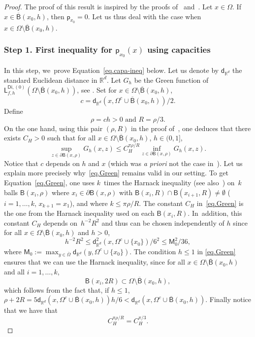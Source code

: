 \documentclass[JEP,XML,SOM,Unicode,NoEqCountersInSection,NoFloatCountersInSection,published]{cedram}
\let\pa\partial
\theoremstyle{plain}
\theoremstyle{definition}
\begin{document}
\begin{proof}
The proof of this result is inspired by the proofs of~\cite[Lem.\,4.6]{BEGK} and~\cite[Prop.\,7.9]{landim2017dirichlet}. Let $x\in \Omega$. If~$x\in \overline{\mathsf B}(x_0,h)$, then $\mathsf p_{x_0}=0$. Let us thus deal with the case when $x\in \Omega\setminus \overline{\mathsf B}(x_0,h)$.

\subsubsection*{Step 1. First inequality for $ \mathsf p_{x_0}(x)$ using capacities}

In this step, we~prove Equation~\eqref{eq.capa-ineq} below. Let us denote by $\mathsf d_{\mathbb R^d}$ the standard Euclidean distance in $\mathbb R^d$. Let $G_h$ be the Green function of $ \mathsf L^{\mathsf{Di},(0)}_{f,h}(\Omega\setminus \overline{\mathsf B}(x_0,h))$, see \cite[Eq.\,(2.3)]{BEGK}.
Set for $x\in \Omega\setminus \overline{\mathsf B}(x_0,h)$,
\begin{equation}\label{eq.cc}
c=\mathsf d_{\mathbb R^d}(x, \Omega^c\cup \overline{\mathsf B}(x_0,h))/2.
\end{equation}
Define
\[
\text{$\rho=ch>0$ and $R=\rho/3$}.
\]
On the one hand, using this pair $(\rho,R)$ in the proof of~\cite[Lem.\,4.6]{BEGK}, one deduces that there exists $C_H>0$ such that for all $x\in\Omega\setminus \overline{\mathsf B}(x_0,h) $, $h\in (0,1]$,
\begin{equation}\label{eq.Green}
\sup_{z\in \pa \mathsf B(x,\rho)}G_h(x,z) \le C_H^{\pi \rho/R}\inf_{z\in \pa \mathsf B(x,\rho)}G_h (x,z).
\end{equation}
Notice that $c$ depends on $h$ and $x$ (which was \textit{a priori} not the case in~\cite[Lem.\,4.6]{BEGK}). Let us explain more precisely why~\eqref{eq.Green} remains valid in our setting. To get Equation~\eqref{eq.Green}, one uses $k$~times the Harnack inequality \cite{MR1814364} (see also~\cite[Lem.\,4.1]{BEGK}) on~$k$ balls $\mathsf B(x_i,\rho)$ where $x_i\in \pa\mathsf B(x,\rho)$ with $\mathsf B(x_i,R)\cap \mathsf B(x_{i+1},R)\neq \emptyset$ ($i=1,\ldots,k$, $x_{k+1}=x_1$), and where $k\le \pi \rho/R$. The constant $C_H$ in~\eqref{eq.Green} is the one from the Harnack inequality used on each $\mathsf B(x_i,R)$. In~addition, this constant $C_H$ depends on~$h^{-2} R^2$ and thus can be chosen independently of $h$ since for all $x\in\Omega\setminus \overline{\mathsf B}(x_0,h)$ and $h>0$,
\[
h^{-2} R^2 \le \mathsf d_{\mathbb R^d}^2(x, \Omega^c\cup \{x_0\})/6^2 \le \mathsf M_0^2/36,
\]
where $\mathsf M_0:=\max_{y\in \overline{\Omega} }\mathsf d_{\mathbb R^d}(y, \Omega^c\cup \{x_0\})$.
The condition $h\le 1$ in \eqref{eq.Green} ensures that we can use the Harnack inequality, since for all $x\in \Omega\setminus \overline{\mathsf B}(x_0,h)$ and all $i=1,\ldots,k$,
\[
{\mathsf B(x_i,2R)} \subset \Omega\setminus \overline{\mathsf B}(x_0,h),
\]
which follows from the fact that, if $h\le 1$, $\rho +2R=5\mathsf d_{\mathbb R^d}(x, \Omega^c\cup \overline{\mathsf B}(x_0,h))h/6<\mathsf d_{\mathbb R^d}(x, \Omega^c\cup \overline{\mathsf B}(x_0,h))$.
Finally notice that we have that
\[
C_H^{\pi \rho/R}=C_H^{\pi /3}.
\]


\end{proof}
\end{document}
